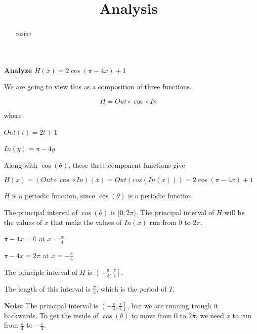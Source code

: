 \documentclass{ximera}
\title{Analysis}
\begin{document}
\begin{abstract}
cosine
\end{abstract}
\maketitle












\textbf{\textcolor{purple!85!blue}{Analyze  $H(x) =  2 \cos(\pi - 4x) + 1$}}





\begin{template}


We are going to view this as a composition of three functions.


\[
H = Out \circ \cos \circ In
\]


where


$Out(t) = 2t + 1$ 


$In(y) = \pi - 4y$ 




Along with $\cos(\theta)$, these three component functions give



\[
H(x) = (Out \circ \cos \circ In)(x) = Out(cos(In(x)))  = 2 \cos(\pi - 4x) + 1
\]




\end{template}

$H$ is a periodic function, since $\cos(\theta)$ is a periodic function. 

The principal interval of $\cos(\theta)$ is $[0, 2\pi)$.  The principal interval of $H$ will be the values of $x$ that make the values of $In(x)$ run from $0$ to $2\pi$. 


$\pi - 4x = 0$ at $x = \frac{\pi}{4}$

$\pi - 4x = 2\pi$ at $x = -\frac{\pi}{4}$

The principle interval of $H$ is $\left( -\frac{\pi}{4}, \frac{\pi}{4} \right]$. 

The length of this interval is $\frac{\pi}{2}$, which is the period of $T$. 


\textbf{Note:}  The principal interval is $\left( -\frac{\pi}{4}, \frac{\pi}{4} \right]$, but we are running trough it backwards.  To get the inside of $\cos(\theta)$ to move from $0$ to $2\pi$, we need $x$ to run from $\frac{\pi}{4}$ to $-\frac{\pi}{4}$.
\end{document}
